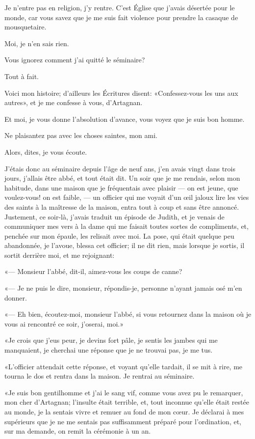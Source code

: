 \speak  Je n'entre pas en religion, j'y rentre. C'est Église que j'avais désertée pour le monde, car vous savez que je me suis fait violence pour prendre la casaque de mousquetaire. 

\speak  Moi, je n'en sais rien. 

\speak  Vous ignorez comment j'ai quitté le séminaire? 

\speak  Tout à fait. 

\speak  Voici mon histoire; d'ailleurs les Écritures disent: «Confessez-vous les uns aux autres», et je me confesse à vous, d'Artagnan. 

\speak  Et moi, je vous donne l'absolution d'avance, vous voyez que je suis bon homme. 

\speak  Ne plaisantez pas avec les choses saintes, mon ami. 

\speak  Alors, dites, je vous écoute. 

\speak  J'étais donc au séminaire depuis l'âge de neuf ans, j'en avais vingt dans trois jours, j'allais être abbé, et tout était dit. Un soir que je me rendais, selon mon habitude, dans une maison que je fréquentais avec plaisir --- on est jeune, que voulez-vous! on est faible, --- un officier qui me voyait d'un œil jaloux lire les vies des saints à la maîtresse de la maison, entra tout à coup et sans être annoncé. Justement, ce soir-là, j'avais traduit un épisode de Judith, et je venais de communiquer mes vers à la dame qui me faisait toutes sortes de compliments, et, penchée sur mon épaule, les relisait avec moi. La pose, qui était quelque peu abandonnée, je l'avoue, blessa cet officier; il ne dit rien, mais lorsque je sortis, il sortit derrière moi, et me rejoignant: 

«--- Monsieur l'abbé, dit-il, aimez-vous les coups de canne? 

«--- Je ne puis le dire, monsieur, répondis-je, personne n'ayant jamais osé m'en donner. 

«--- Eh bien, écoutez-moi, monsieur l'abbé, si vous retournez dans la maison où je vous ai rencontré ce soir, j'oserai, moi.» 

«Je crois que j'eus peur, je devins fort pâle, je sentis les jambes qui me manquaient, je cherchai une réponse que je ne trouvai pas, je me tus. 

«L'officier attendait cette réponse, et voyant qu'elle tardait, il se mit à rire, me tourna le dos et rentra dans la maison. Je rentrai au séminaire. 

«Je suis bon gentilhomme et j'ai le sang vif, comme vous avez pu le remarquer, mon cher d'Artagnan; l'insulte était terrible, et, tout inconnue qu'elle était restée au monde, je la sentais vivre et remuer au fond de mon cœur. Je déclarai à mes supérieurs que je ne me sentais pas suffisamment préparé pour l'ordination, et, sur ma demande, on remit la cérémonie à un an. 

